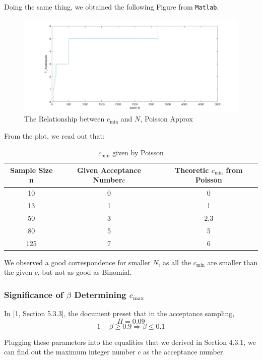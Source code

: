 \documentclass[a4paper]{article}
\begin{document}
Doing the same thing, we obtained the following Figure from \texttt{Matlab}.
\begin{figure}[!htbp] 
\centering 
\includegraphics[width=1\linewidth]{alpha-pois.jpg}  
\caption{The Relationship between $c_{\min}$ and $N$, Poisson Approx} 
\end{figure}

From the plot, we read out that:
\begin{table}[!htbp]
  \centering
    \begin{tabular}{ccc}
    \hline
    Sample Size n & Given Acceptance Number$c$ & Theoretic $c_{\min}$ from Poisson \\
    \hline
    10    & 0     & 0 \\
    13    & 1     & 1 \\
    50    & \cellcolor[rgb]{ .851,  .882,  .949}3     & \cellcolor[rgb]{ .851,  .882,  .949}2,3 \\
    80    & 5     & 5 \\
    125   & \cellcolor[rgb]{ .851,  .882,  .949}7 & \cellcolor[rgb]{ .851,  .882,  .949}6 \\
    \hline
    \end{tabular}%
    \caption{$c_{\min}$ given by Poisson}
\end{table}%

We observed a good correspondence for smaller $N$, as all the $c_{\min}$ are smaller than the given $c$, but not as good as Binomial.

\newpage

\subsubsection{Significance of $\beta$ Determining $c_{\max}$}
In [1, Section 5.3.3], the document preset that in the acceptance sampling,
$$\Pi = 0.09$$
$$1 - \beta \geq 0.9 \Rightarrow \beta \leq 0.1$$

Plugging these parameters into the equalities that we derived in Section 4.3.1, we can find out the maximum integer number $c$ as the acceptance number.
\end{document}
